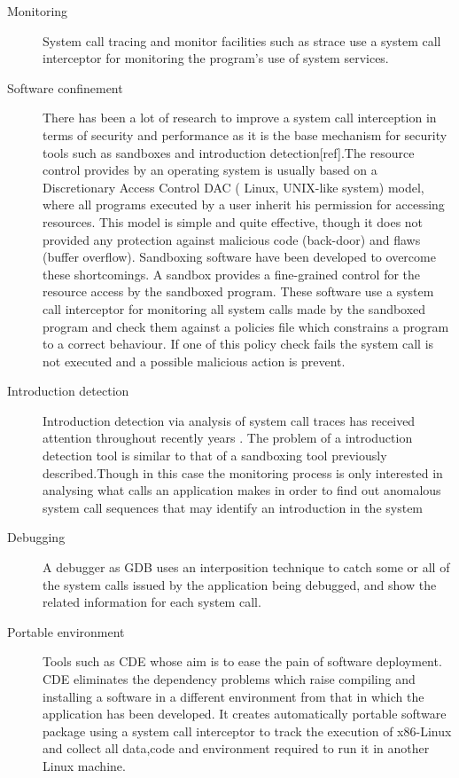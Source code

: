 \begin{description}

\item[Monitoring]
System call tracing and monitor facilities such as strace \cite{strace} use a system call interceptor for monitoring the program's use of system services. 

\item[Software confinement]
There has been a lot of research to improve a system call interception in terms of security and performance as it is the base mechanism for security tools such as sandboxes and introduction detection[ref].The resource control provides by an operating system is usually based on a Discretionary Access Control DAC ( Linux, UNIX-like system) model, where all programs executed by a user inherit his permission for accessing resources. This model is simple and quite effective, though it does not provided any protection against malicious code (back-door) and flaws (buffer overflow). Sandboxing software \cite{MapBox, Janus, Systrace, sfi, Noordende_asecure} have been developed to overcome these shortcomings. A sandbox provides a fine-grained control for the resource access by the sandboxed program. These software use a system call interceptor for monitoring all system calls made by the sandboxed program and check them against a policies file which constrains a program to a correct behaviour. If one of this policy check fails the system call is not executed and a possible malicious action is prevent. 

\item[Introduction detection]
Introduction detection via analysis of system call traces has received attention throughout recently years \cite{introd_detection, Kosoresow97intrusiondetection}. The problem of a introduction  detection tool  is similar to that of a sandboxing tool previously described.Though in this case the monitoring process is only interested in analysing what calls an application makes in order to find out anomalous system call sequences that may identify an introduction in the system  

\item[Debugging] 
A debugger as GDB uses an interposition technique to catch some or all of the system calls issued by the application being debugged, and show the related information for each system call. 

\item[Portable environment]
Tools such as CDE  \cite{CDE} whose aim is to ease the pain of software deployment. CDE  eliminates the dependency problems which raise compiling and installing a software in a different environment from that in which the application has been developed. It creates automatically portable software package using a system call interceptor to track the execution of x86-Linux and collect all data,code and environment required to run it in another Linux machine.   


\end{description}
